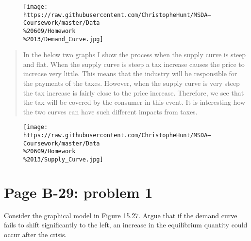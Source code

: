 \documentclass[]{article}
\begin{document}
\begin{figure}[htbp]
\centering
\texttt{[image: https://raw.githubusercontent.com/ChristopheHunt/MSDA---Coursework/master/Data\\\%20609/Homework\\\%2013/Demand\_Curve.jpg]}
\caption{}
\end{figure}

\begin{quote}
In the below two graphs I show the process when the supply curve is
steep and flat. When the supply curve is steep a tax increase causes the
price to increase very little. This means that the industry will be
responsible for the payments of the taxes. However, when the supply
curve is very steep the tax increase is fairly close to the price
increase. Therefore, we see that the tax will be covered by the consumer
in this event. It is interesting how the two curves can have such
different impacts from taxes.
\end{quote}

\begin{figure}[htbp]
\centering
\texttt{[image: https://raw.githubusercontent.com/ChristopheHunt/MSDA---Coursework/master/Data\\\%20609/Homework\\\%2013/Supply\_Curve.jpg]}
\caption{}
\end{figure}

\section{Page B-29: problem 1}\label{page-b-29-problem-1}

Consider the graphical model in Figure 15.27. Argue that if the demand
curve fails to shift significantly to the left, an increase in the
equilibrium quantity could occur after the crisis.
\end{document}
